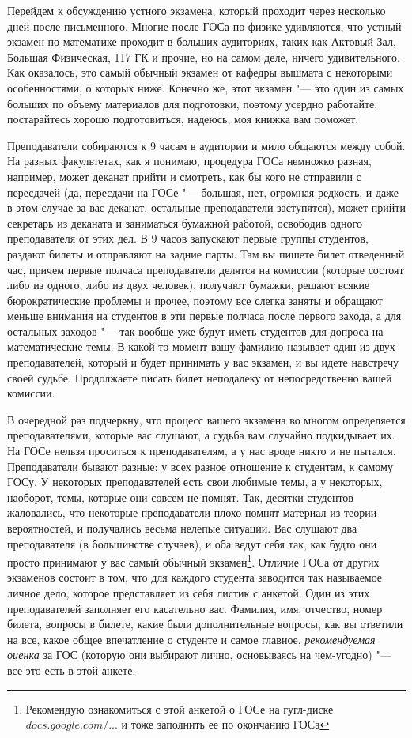 Перейдем к обсуждению устного экзамена, который проходит через несколько дней после письменного. Многие после ГОСа по физике удивляются, что устный экзамен по математике проходит в больших аудиториях, таких как Актовый Зал, Большая Физическая, 117 ГК и прочие, но на самом деле, ничего удивительного. Как оказалось, это самый обычный экзамен от кафедры вышмата с некоторыми особенностями, о которых ниже. Конечно же, этот экзамен "--- это один из самых больших по объему материалов для подготовки, поэтому усердно работайте, постарайтесь хорошо подготовиться, надеюсь, моя книжка вам поможет.

Преподаватели собираются к 9 часам в аудитории и мило общаются между собой. На разных факультетах, как я понимаю, процедура ГОСа немножко разная, например, может деканат прийти и смотреть, как бы кого не отправили с пересдачей (да, пересдачи на ГОСе "--- большая, нет, огромная редкость, и даже в этом случае за вас деканат, остальные преподаватели заступятся), может прийти секретарь из деканата и заниматься бумажной работой, освободив одного преподавателя от этих дел. В 9 часов запускают первые группы студентов, раздают билеты и отправляют на задние парты. Там вы пишете билет отведенный час, причем первые полчаса  преподаватели делятся на комиссии (которые состоят либо из одного, либо из двух человек), получают бумажки, решают всякие бюрократические проблемы и прочее, поэтому все слегка заняты и обращают меньше внимания на студентов в эти первые полчаса после первого захода, а для остальных заходов "--- так вообще уже будут иметь студентов для допроса на математические темы. В какой-то момент вашу фамилию называет один из двух преподавателей, который и будет принимать у вас экзамен, и вы идете навстречу своей судьбе. Продолжаете писать билет неподалеку от непосредственно вашей комиссии.

В очередной раз подчеркну, что процесс вашего экзамена во многом определяется преподавателями, которые вас слушают, а судьба вам случайно подкидывает их. На ГОСе нельзя проситься к преподавателям, а у нас вроде никто и не пытался. Преподаватели бывают разные: у всех разное отношение к студентам, к самому ГОСу. У некоторых преподавателей есть свои любимые темы, а у некоторых, наоборот, темы, которые они совсем не помнят. Так, десятки студентов жаловались, что некоторые преподаватели плохо помнят материал из теории вероятностей, и получались весьма нелепые ситуации. Вас слушают два преподавателя (в большинстве случаев), и оба ведут себя так, как будто они просто принимают у вас самый обычный экзамен\footnote{Рекомендую ознакомиться с  этой анкетой о ГОСе на гугл-диске \href{https://docs.google.com/spreadsheets/d/1l2de9_qlCLvvqJIK8ZY6rtk_TJQbvo8cWd5o7uVtl2M/edit\#gid=0}{$docs.google.com/...$} и тоже заполнить ее по окончанию ГОСа}. Отличие ГОСа от других экзаменов состоит в том, что для каждого студента заводится так называемое личное дело, которое представляет из себя листик с анкетой. Один из этих преподавателей заполняет его касательно вас. Фамилия, имя, отчество, номер билета, вопросы в билете, какие были дополнительные вопросы, как вы ответили на все, какое общее впечатление о студенте и самое главное, \textit{рекомендуемая оценка} за ГОС (которую они выбирают лично, основываясь на чем-угодно) "--- все это есть в этой анкете. 

